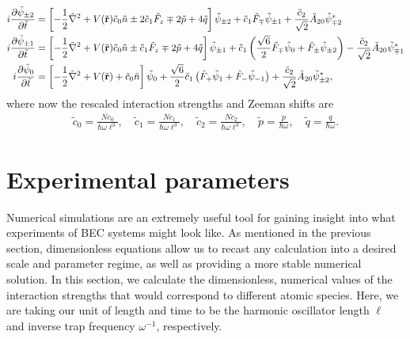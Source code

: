 \begin{align}
    i\pdv{\tilde{\psi}_{\pm 2}}{\tilde{t}} &= \left[-\frac{1}{2}\tilde{\nabla}^2
    +V(\tilde{\vb{r}}) \tilde{c}_0\tilde{n} \pm 2\tilde{c}_1\tilde{F}_z
    \mp 2\tilde{p} + 4\tilde{q}\right]\tilde{\psi}_{\pm 2}
    + \tilde{c}_1\tilde{F}_\mp\tilde{\psi}_{\pm 1}
    + \frac{\tilde{c}_2}{\sqrt{2}}\tilde{A}_{20}\tilde{\psi}_{\mp 2}^* \\
    i\pdv{\tilde{\psi}_{\pm 1}}{\tilde{t}} &= \left[-\frac{1}{2}\tilde{\nabla}^2
    +V(\tilde{\vb{r}}) \tilde{c}_0\tilde{n} \pm \tilde{c}_1\tilde{F}_z
    \mp 2\tilde{p} + 4\tilde{q}\right]\tilde{\psi}_{\pm 1}
    +\tilde{c}_1\left(\frac{\sqrt{6}}{2}\tilde{F}_\mp \tilde{\psi}_0
    +\tilde{F}_\pm\tilde{\psi}_{\pm 2}\right)
    - \frac{\tilde{c}_2}{\sqrt{2}}\tilde{A}_{20}\tilde{\psi}_{\mp 1}^* \\
    i\pdv{\tilde{\psi}_0}{\tilde{t}} &= \left[-\frac{1}{2}\tilde{\nabla}^2
    +V(\tilde{\vb{r}})+\tilde{c}_0\tilde{n}\right]\tilde{\psi}_0
    +\frac{\sqrt{6}}{2}\tilde{c}_1\left(\tilde{F}_+\tilde{\psi}_1
    +\tilde{F}_-\tilde{\psi}_{-1}\right)
    + \frac{\tilde{c}_2}{\sqrt{2}}\tilde{A}_{20}\tilde{\psi}_{\pm 2}^*,
\end{align}
where now the rescaled interaction strengths and Zeeman shifts are
\begin{align}\label{eq: spin-2-interaction-strengths-dimensionless}
    \tilde{c}_0 = \frac{Nc_0}{\hbar\omega\ell^3}, \quad
    \tilde{c}_1 = \frac{Nc_1}{\hbar\omega\ell^3}, \quad
    \tilde{c}_2 = \frac{Nc_2}{\hbar\omega\ell^3}, \quad
    \tilde{p} = \frac{p}{\hbar\omega}, \quad
    \tilde{q} = \frac{q}{\hbar\omega}.
\end{align}

\section{Experimental parameters}
Numerical simulations are an extremely useful tool for gaining insight into
what experiments of BEC systems might look like.
As mentioned in the previous section, dimensionless equations allow us to
recast any calculation into a desired scale and parameter regime, as well as
providing a more stable numerical solution.
In this section, we calculate the dimensionless, numerical values of the
interaction strengths that would correspond to different atomic species.
Here, we are taking our unit of length and time to be the harmonic oscillator
length \(\ell \) and inverse trap frequency \(\omega^{-1}\), respectively.

